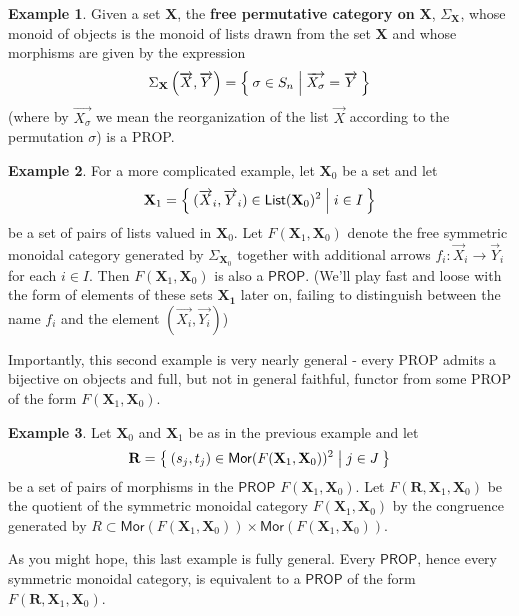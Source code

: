 \documentclass[pra,floatfix,
amsmath,superscriptaddress, 12pt]{article}
\theoremstyle{definition}
\newtheorem*{example}{Example}
\newcommand{\msf}[1]{\mathsf{#1}}
\begin{document}
\begin{example}
Given a set $\mathbf{X}$, the \textbf{free permutative category on} $\mathbf{X}$, $\Sigma_{\mathbf{X}}$, whose monoid of objects is the monoid of lists drawn from the set $\mathbf{X}$ and whose morphisms are given by the expression
\[
    \Sigma_{\mathbf{X}}\left(\overrightarrow{X},\overrightarrow{Y}\right)
    =
    \Set{\sigma \in S_{n} | \overrightarrow{X_\sigma}=\overrightarrow{Y}}
\]
(where by $\overrightarrow{X_\sigma}$ we mean the reorganization of the list $\overrightarrow{X}$ according to the permutation $\sigma$) is a \textsf{PROP}.
\end{example}

\begin{example}
For a more complicated example, let $\mathbf{X}_0$ be a set and let
\[
    \mathbf{X}_1
    =
    \Set{(\overrightarrow{X}_i,\overrightarrow{Y}_i) \in \mathsf{List}(\mathbf{X}_0)^2| i \in I}
\]
be a set of pairs of lists valued in $\mathbf{X}_0$. Let $F(\mathbf{X}_1,\mathbf{X}_0)$ denote the free symmetric monoidal category generated by $\Sigma_{\mathbf{X}_0}$ together with additional arrows $f_{i}:\overrightarrow{X}_i \longrightarrow \overrightarrow{Y}_i$ for each $i\in I$. Then $F(\mathbf{X}_1,\mathbf{X}_0)$ is also a $\msf{PROP}$. (We'll play fast and loose with the form of elements of these sets $\mathbf{X_1}$ later on, failing to distinguish between the name $f_i$ and the element $(\overrightarrow{X_i},\overrightarrow{Y_i})$)
\end{example}

Importantly, this second example is very nearly general - every \textsf{PROP} admits a bijective on objects and full, but not in general faithful, functor from some \textsf{PROP} of the form $F(\mathbf{X}_1,\mathbf{X}_0)$.

\begin{example}
 Let  $\mathbf{X}_0$ and $\mathbf{X}_1$ be as in the previous example and let
 \[
    \mathbf{R}=\Set{ (s_j,t_j) \in \mathsf{Mor}(F(\mathbf{X}_1,\mathbf{X}_0))^2 | j \in J}
 \]
 be a set of pairs of morphisms in the $\mathsf{PROP}$ $F(\mathbf{X}_1,\mathbf{X}_0)$. Let $F(\mathbf{R},\mathbf{X}_1,\mathbf{X}_0)$ be the quotient of the symmetric monoidal category $F(\mathbf{X}_1,\mathbf{X}_0)$ by the congruence generated by $R \subset \mathsf{Mor}(F(\mathbf{X}_1,\mathbf{X}_0)) \times \mathsf{Mor}(F(\mathbf{X}_1,\mathbf{X}_0))$.
\end{example}

As you might hope, this last example is fully general. Every $\mathsf{PROP}$, hence every symmetric monoidal category, is equivalent to a $\mathsf{PROP}$ of the form $F(\mathbf{R},\mathbf{X}_1,\mathbf{X}_0)$.
\end{document}
